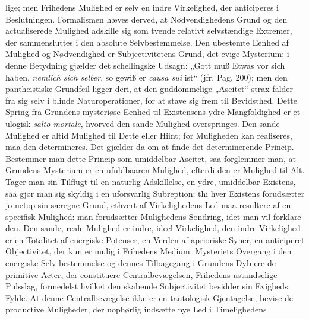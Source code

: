 \documentclass[12pt]{book}
\newcommand{\opage}[1]{\marginnote{\footnotesize\textit{[#1]}}}
\begin{document}
lige; men Frihedens Mulighed er selv en indre Virkelighed, der anticiperes i
Beslutningen. Formalismen hæves derved, at Nødvendighedens Grund og den actualiserede
Mulighed adskille sig som tvende relativt selvstændige Extremer, der sammensluttes i den
absolute Selvbestemmelse. Den ubestemte Eenhed af Mulighed og Nødvendighed er
Subjectivitetens Grund, det evige Mysterium; i denne Betydning gjælder det schellingske
Udsagn: „Gott muß Etwas vor sich haben, \emph{nemlich sich selber}, so gewiß er
\textit{causa sui} ist“ (jfr. Pag. 200); men den pantheistiske Grundfeil ligger deri, at
den guddommelige „Aseitet“ strax falder fra sig selv i blinde Naturoperationer, for at
stave sig frem til Bevidsthed. Dette Spring fra Grundens mysteriøse Eenhed til
Existensens ydre Mangfoldighed er et ulogisk \textit{salto mortale}, hvorved den sande
Mulighed overspringes. Den sande Mulighed er altid Mulighed til Dette eller Hiint; før
Muligheden kan realiseres, maa den determineres. Det gjælder da om at finde det
determinerende Princip. Bestemmer man dette Princip som umiddelbar Aseitet, saa
forglemmer man, at Grundens Mysterium er en ufuldbaaren Mulighed, efterdi den er
Mulighed til Alt. Tager man sin Tilflugt til en naturlig Adskillelse, en ydre,
umiddelbar Existens, saa gjør man sig skyldig i en uforsvarlig Subreption; thi hver
Existens forudsætter jo netop sin særegne Grund, ethvert af Virkelighedens Led maa
resultere af en specifisk Mulighed: man forudsætter Mulighedens Sondring, idet man vil
forklare den. Den sande, reale Mulighed er indre, ideel Virkelighed, den indre
Virkelighed er en Totalitet af energiske Potenser, en Verden af aprioriske Syner, en
anticiperet Objectivitet, der kun er mulig i Frihedens Medium. Mysteriets Overgang i den
energiske Selv%
\opage{217}bestemmelse og dennes Tilbagegang i Grundens Dyb ere de primitive Acter, der constituere
Centralbevægelsen, Frihedens ustandselige Pulsslag, formedelst hvilket den skabende
Subjectivitet besidder sin Evigheds Fylde. At denne Centralbevægelse ikke er en tautologisk
Gjentagelse, bevise de productive Muligheder, der uophørlig indsætte nye Led i Timelighedens
\end{document}
